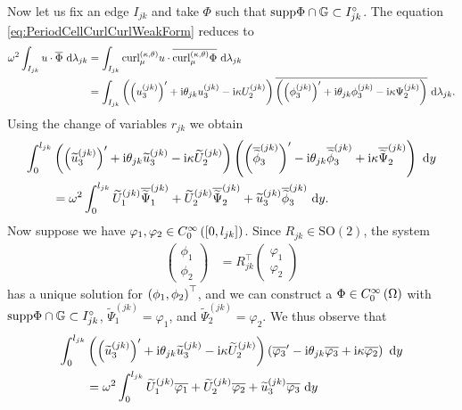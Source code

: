 Now let us fix an edge $I_{jk}$ and take $\Phi$ such that $\mathrm{supp}\Phi\cap\mathbb{G}\subset I_{jk}^{\circ}$.
The equation \eqref{eq:PeriodCellCurlCurlWeakForm} reduces to
\begin{align*}
	\omega^2 \int_{I_{jk}} u\cdot\overline{\Phi}  \ \mathrm{d}\lambda_{jk}
	&= \int_{I_{jk}} \mathrm{curl}_{\mu}^{\left( \kappa, \theta \right)}u\cdot\overline{\mathrm{curl}_{\mu}^{\left( \kappa, \theta \right)}\Phi}  \ \mathrm{d}\lambda_{jk} \\
	&= \int_{I_{jk}} \left(  \left( u_3^{(jk)} \right)' + \mathrm{i}\theta_{jk} u_3^{(jk)} - \mathrm{i}\kappa U_2^{(jk)}  \right)\overline{\left(  \left( \phi_3^{(jk)} \right)' + \mathrm{i}\theta_{jk} \phi_3^{(jk)} - \mathrm{i}\kappa \Psi_2^{(jk)}  \right)}  \ \mathrm{d}\lambda_{jk}.
\end{align*}
Using the change of variables $r_{jk}$ we obtain
\begin{align*}
	\int_0^{l_{jk}} & \left(  \left( \widetilde{u}_3^{(jk)} \right)' + \mathrm{i}\theta_{jk} \widetilde{u}_3^{(jk)} - \mathrm{i}\kappa \widetilde{U}_2^{(jk)}  \right) \left(  \left( \overline{\widetilde{\phi}}_3^{(jk)} \right)' - \mathrm{i}\theta_{jk} \overline{\widetilde{\phi}}_3^{(jk)} + \mathrm{i}\kappa \overline{\widetilde{\Psi}}_2^{(jk)}  \right) \ \mathrm{d} y \\
	&= \omega^2 \int_0^{l_{jk}} \widetilde{U}_1^{(jk)}\overline{\widetilde{\Psi}}_1^{(jk)} + \widetilde{U}_2^{(jk)}\overline{\widetilde{\Psi}}_2^{(jk)} + \widetilde{u}_3^{(jk)}\overline{\widetilde{\phi}}_3^{(jk)} \ \mathrm{d} y.
\end{align*}
Now suppose we have $\varphi_1,\varphi_2\in C^{\infty}_{0}\left( \left[ 0,l_{jk} \right] \right)$.
Since $R_{jk}\in\mathrm{SO}(2)$, the system
\begin{align*}
	\begin{pmatrix} \phi_1 \\ \phi_2 \end{pmatrix} &= R_{jk}^\top \begin{pmatrix} \varphi_1 \\ \varphi_2 \end{pmatrix}
\end{align*}
has a unique solution for $\left( \phi_1,\phi_2 \right)^\top$, and we can construct a $\Phi\in C^{\infty}_{0}\left( \Omega \right)$ with $\mathrm{supp}\Phi\cap\mathbb{G}\subset I_{jk}^{\circ}$, $\widetilde{\Psi}_1^{(jk)}=\varphi_1$, and $\widetilde{\Psi}_2^{(jk)}=\varphi_2$.
We thus observe that
\begin{align*}
	\int_0^{l_{jk}} & \left(  \left( \widetilde{u}_3^{(jk)} \right)' + \mathrm{i}\theta_{jk} \widetilde{u}_3^{(jk)} - \mathrm{i}\kappa \widetilde{U}_2^{(jk)}  \right) \left(  \overline{\varphi_3}' - \mathrm{i}\theta_{jk} \overline{\varphi_3} + \mathrm{i}\kappa \overline{\varphi_2}  \right) \ \mathrm{d} y \\
	&= \omega^2 \int_0^{l_{jk}} \widetilde{U}_1^{(jk)}\overline{\varphi_1} + \widetilde{U}_2^{(jk)}\overline{\varphi_2} + \widetilde{u}_3^{(jk)}\overline{\varphi_3} \ \mathrm{d} y
\end{align*}
